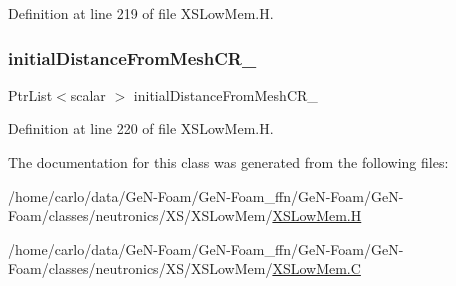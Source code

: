Definition at line 219 of file X\+S\+Low\+Mem.\+H.

\mbox{\label{classFoam_1_1XSLowMem_a950f9c7de67d1956bd963be294a6ab4e}} 
\subsubsection{\texorpdfstring{initial\+Distance\+From\+Mesh\+C\+R\+\_\+}{initialDistanceFromMeshCR\_}}
{\footnotesize\ttfamily Ptr\+List$<$scalar $>$ initial\+Distance\+From\+Mesh\+C\+R\+\_\+\hspace{0.3cm}{\ttfamily [protected]}}



Definition at line 220 of file X\+S\+Low\+Mem.\+H.



The documentation for this class was generated from the following files\+:\begin{DoxyCompactItemize}
\item 
/home/carlo/data/\+Ge\+N-\/\+Foam/\+Ge\+N-\/\+Foam\+\_\+ffn/\+Ge\+N-\/\+Foam/\+Ge\+N-\/\+Foam/classes/neutronics/\+X\+S/\+X\+S\+Low\+Mem/\hyperlink{XSLowMem_8H}{X\+S\+Low\+Mem.\+H}\item 
/home/carlo/data/\+Ge\+N-\/\+Foam/\+Ge\+N-\/\+Foam\+\_\+ffn/\+Ge\+N-\/\+Foam/\+Ge\+N-\/\+Foam/classes/neutronics/\+X\+S/\+X\+S\+Low\+Mem/\hyperlink{XSLowMem_8C}{X\+S\+Low\+Mem.\+C}\end{DoxyCompactItemize}
